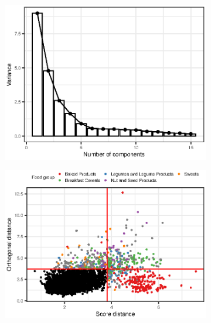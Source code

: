 \documentclass[titlepage]{article}
\begin{document}
\begin{landscape}
  \vfill
  \begin{figure}
    \begin{minipage}{0.5\linewidth}
      \begin{subfigure}{\linewidth}
        \centering
        \includegraphics{q2-screeplot}
        \label{fig:q2-scree}
      \end{subfigure}
      \begin{subfigure}{\linewidth}
        \centering
        \includegraphics{q2-outlier-plot}
        \label{fig:q2-outlier}
      \end{subfigure}

\end{minipage}
\end{figure}
\end{landscape}
\end{document}
